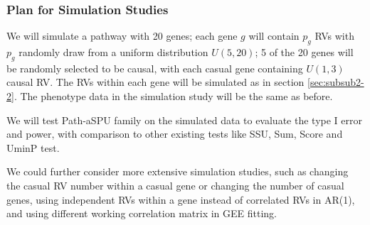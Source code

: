 \documentclass[12pt]{article}
\begin{document}
\subsubsection{Plan for Simulation Studies}\label{sec:aim2-3}
We will simulate a pathway with 20 genes; each gene $g$ will contain $p_g$ RVs with $p_g$ randomly draw from a uniform distribution $U(5,20)$; 5 of the 20 genes will be randomly selected to be causal, with each casual gene containing $U(1,3)$ causal RV. The RVs within each gene will be simulated as in section \ref{sec:subsub2-2}. The phenotype data in the simulation study will be the same as before.

We will test Path-aSPU family on the simulated data to evaluate the type I error and power, with comparison to other existing tests like SSU, Sum, Score and UminP test.


We could further consider more extensive simulation studies, such as changing the casual RV number within a casual gene or changing the number of casual genes, using independent RVs within a gene instead of correlated RVs in AR(1), and using different working correlation matrix in GEE fitting.


\end{document}
